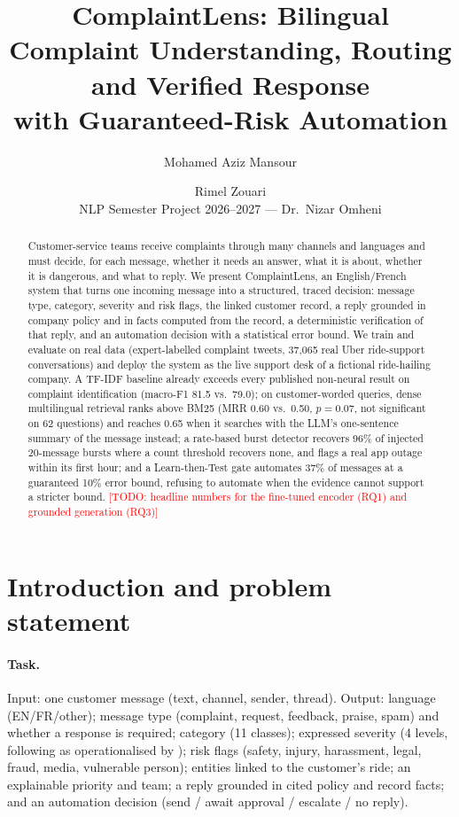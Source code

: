 \documentclass[11pt,a4paper]{article}
\title{ComplaintLens: Bilingual Complaint Understanding, Routing and Verified Response\\
with Guaranteed-Risk Automation}
\author{Mohamed Aziz Mansour \and Rimel Zouari\\[2pt]
\small NLP Semester Project 2026--2027 --- Dr.\ Nizar Omheni}
\date{\todo{submission date}}
\newcommand{\todo}[1]{\textcolor{red}{[TODO: #1]}}
\begin{document}
\maketitle

\begin{abstract}
Customer-service teams receive complaints through many channels and languages and must decide, for
each message, whether it needs an answer, what it is about, whether it is dangerous, and what to
reply. We present ComplaintLens, an English/French system that turns one incoming message into a
structured, traced decision: message type, category, severity and risk flags, the linked customer
record, a reply grounded in company policy and in facts computed from the record, a deterministic
verification of that reply, and an automation decision with a statistical error bound. We train and
evaluate on real data (expert-labelled complaint tweets, 37{,}065 real Uber ride-support conversations)
and deploy the system as the live support desk of a fictional ride-hailing company.
A TF-IDF baseline already exceeds every published non-neural result on complaint identification
(macro-F1 81.5 vs.\ 79.0); on customer-worded queries, dense multilingual retrieval ranks above
BM25 (MRR 0.60 vs.\ 0.50, $p=0.07$, not significant on 62 questions) and reaches 0.65 when it searches
with the LLM's one-sentence summary of the message instead; a rate-based burst detector
recovers 96\% of injected 20-message bursts where a count threshold recovers none, and flags a real
app outage within its first hour; and a Learn-then-Test gate automates 37\% of messages at a
guaranteed 10\% error bound, refusing to automate when the evidence cannot support a stricter bound.
\todo{headline numbers for the fine-tuned encoder (RQ1) and grounded generation (RQ3)}
\end{abstract}

\section{Introduction and problem statement}
\label{sec:intro}
\paragraph{Task.} Input: one customer message (text, channel, sender, thread). Output: language
(EN/FR/other); message type (complaint, request, feedback, praise, spam) and whether a response is
required; category (11 classes); expressed severity (4 levels, following \citet{trosborg1995pragmatics}
as operationalised by \citet{jin2021severity}); risk flags (safety, injury, harassment, legal, fraud,
media, vulnerable person); entities linked to the customer's ride; an explainable priority
and team; a reply grounded in cited policy and record facts; and an automation decision
(send / await approval / escalate / no reply).
\end{document}

